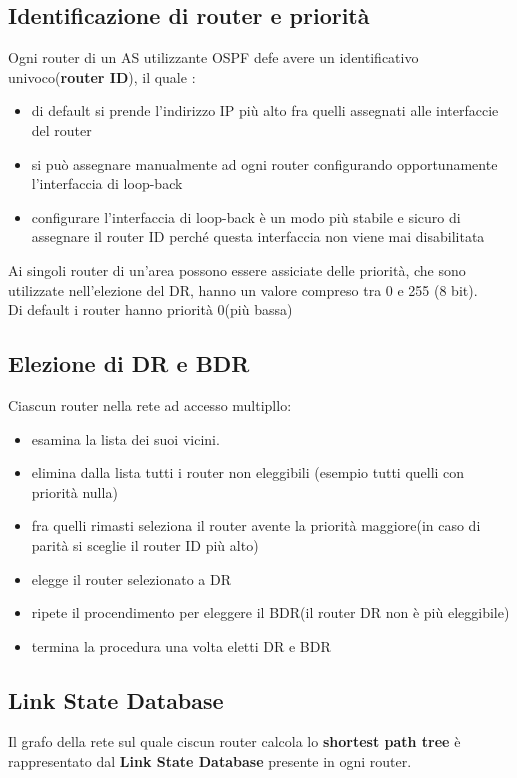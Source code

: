 \documentclass{report}
\begin{document}
            \subsection{Identificazione di router e priorità }
                Ogni router di un AS utilizzante OSPF defe avere un identificativo univoco(\textbf{router ID}), il quale :
                \begin{itemize}
                    \item di default si prende l'indirizzo IP più alto fra quelli assegnati alle interfaccie del router
                    \item si può assegnare manualmente ad ogni router configurando opportunamente l'interfaccia di loop-back 
                    \item configurare l'interfaccia di loop-back è un modo più stabile e
                    sicuro di assegnare il router ID perché questa interfaccia non
                    viene mai disabilitata
                \end{itemize}
                Ai singoli router di un'area possono essere assiciate delle priorità, che sono utilizzate nell'elezione del DR, hanno un valore compreso tra 0 e 255 (8 bit).
                \\
                Di default i router hanno priorità 0(più bassa)
            \subsection{Elezione di DR e BDR}
                Ciascun router nella rete ad accesso multipllo:
                \begin{itemize}
                    \item esamina la lista dei suoi vicini.
                    \item elimina dalla lista tutti i router non eleggibili (esempio tutti quelli con priorità nulla)
                    \item fra quelli rimasti seleziona il router avente la priorità maggiore(in caso di parità si sceglie il router ID più alto)
                    \item elegge il router selezionato a DR
                    \item ripete il procendimento per eleggere il BDR(il router DR non è più eleggibile)
                    \item termina la procedura una volta eletti DR e BDR
                \end{itemize}
            \subsection{Link State Database}
                Il grafo della rete sul quale ciscun router calcola lo \textbf{shortest path tree} è rappresentato dal \textbf{Link State Database} presente in ogni router.
\end{document}
